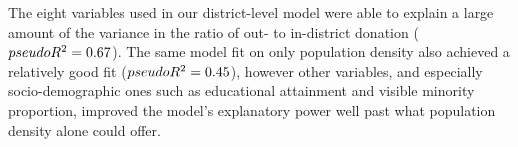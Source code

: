 \documentclass[
  letterpaper,
  DIV=11,
  numbers=noendperiod]{scrartcl}
\begin{document}
The eight variables used in our district-level model were able to
explain a large amount of the variance in the ratio of out- to
in-district donation (\({pseudo} \space R^2 = 0.67\)). The same model
fit on only population density also achieved a relatively good fit
(\({pseudo} \space R^2 = 0.45\)), however other variables, and
especially socio-demographic ones such as educational attainment and
visible minority proportion, improved the model's explanatory power well
past what population density alone could offer.

\begin{table}

\caption{\label{tbl-results-model-individual}Results from a logistic
regression model where the outcome is whether or not an individual
donation was sent out-of-district. The reference entity is the district
association, the reference party is the Conservative Party, and the
reference region is Ontario. Estimates are bolded when significant at
the alpha = 0.05 level. Small losses (\textasciitilde{} 1.1\% of
entries) were incurred due to missingness in the census data.}

\centering{

}
\end{table}
\end{document}
